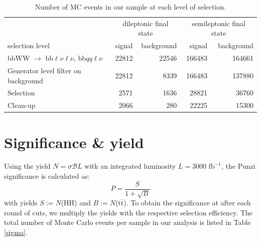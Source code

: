\documentclass[10pt,a4paper]{article}
\renewcommand{\tt}{\ensuremath{\text{t}\bar{\text{t}}}}
\newcommand{\channels}{bbWW $\rightarrow$ bb$\ell\nu\ell\nu$, bb$qq\ell\nu$} %
\newcommand{\BR}{\mathcal{B}}
\begin{document}
\begin{table}[p]
	\centering
	\caption{Number of MC events in our sample at each level of selection.} \vspace{5pt}
	\label{raw}
	\begin{tabular}{@{\quad}lrrrr@{}}
	
	\toprule
	               & \multicolumn{2}{c}{dileptonic final state} & \multicolumn{2}{c}{semileptonic final state} \\
	\cmidrule(r){2-3} \cmidrule(r){4-5}
	selection level                      &  signal  & background &  signal  & background \\
	\midrule
	\channels				             &  22812  &  22546 & 166483 & 164661 \\
	Generator level filter on background &  22812  &   8339 & 166483 & 137880 \\
	Selection                            &   2571  &   1636 &  28821 &  36760 \\
	Clean-up                             &   2066  &    280 &  22225 &  15300 \\
	\bottomrule
	
	\end{tabular}
\end{table}





\section{Significance \& yield}

Using the yield $N = \sigma \BR L$ with an integrated luminosity $L = 3000 \text{ fb}^{-1}$, the Punzi significance is calculated as:
\begin{equation} \label{P}
	P = \frac{S}{1+\sqrt{B}}
\end{equation}
with yields $S:=N$(HH) and $B:=N$(\tt). To obtain the significance at after each round of cuts, we multiply the yields with the respective selection efficiency. %
The total number of Monte Carlo events per sample in our analysis is listed in Table \ref{sigma}. %
\end{document}
